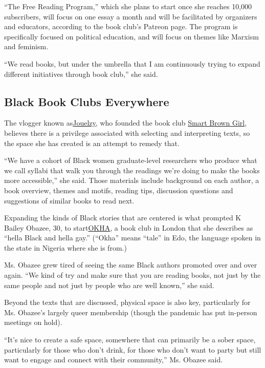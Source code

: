``The Free Reading Program,'' which she plans to start once she reaches
10,000 subscribers, will focus on one essay a month and will be
facilitated by organizers and educators, according to the book club's
Patreon page. The program is specifically focused on political
education, and will focus on themes like Marxism and feminism.

``We read books, but under the umbrella that I am continuously trying to
expand different initiatives through book club,'' she said.

\hypertarget{black-book-clubs-everywhere}{%
\subsection{Black Book Clubs
Everywhere}\label{black-book-clubs-everywhere}}

The vlogger known
as\href{https://www.youtube.com/user/jouelzy}{Jouelzy}, who founded the
book club \href{https://www.smartbrowngirl.com/}{Smart Brown Girl},
believes there is a privilege associated with selecting and interpreting
texts, so the space she has created is an attempt to remedy that.

``We have a cohort of Black women graduate-level researchers who produce
what we call syllabi that walk you through the readings we're doing to
make the books more accessible,'' she said. Those materials include
background on each author, a book overview, themes and motifs, reading
tips, discussion questions and suggestions of similar books to read
next.

Expanding the kinds of Black stories that are centered is what prompted
K Bailey Obazee, 30, to
start\href{https://www.instagram.com/prim.black/}{OKHA}, a book club in
London that she describes as ``hella Black and hella gay.'' (``Okha''
means ``tale'' in Edo, the language spoken in the state in Nigeria where
she is from.)

Ms. Obazee grew tired of seeing the same Black authors promoted over and
over again. ``We kind of try and make sure that you are reading books,
not just by the same people and not just by people who are well known,''
she said.

Beyond the texts that are discussed, physical space is also key,
particularly for Ms. Obazee's largely queer membership (though the
pandemic has put in-person meetings on hold).

``It's nice to create a safe space, somewhere that can primarily be a
sober space, particularly for those who don't drink, for those who don't
want to party but still want to engage and connect with their
community,'' Ms. Obazee said.

